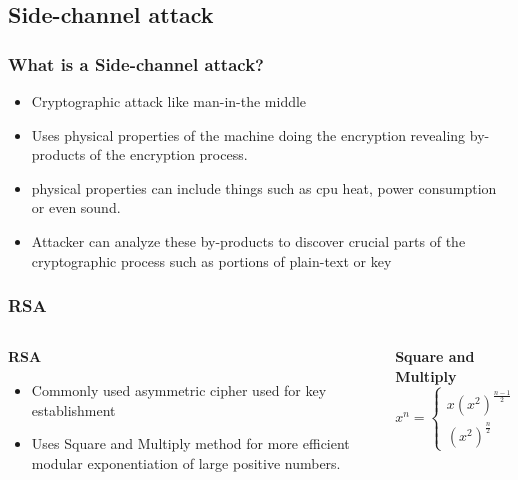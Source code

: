 \documentclass{beamer}
\begin{document}
	\subsection{Side-channel attack}
		\begin{frame}
		\frametitle{What is a Side-channel attack?}
			\begin{itemize}
			\item Cryptographic attack like man-in-the middle\\
			\item Uses physical properties of the machine doing the encryption revealing by-products of the encryption process.  \\
			\item physical properties can include things such as cpu heat, power consumption or even sound.
			\item Attacker can analyze these by-products to discover crucial parts of the cryptographic process such as portions of plain-text or key
		\end{itemize}
		\end{frame}
		\begin{frame}
		\frametitle{RSA}
		\begin{columns}[c]
		\begin{column}{.45\textwidth}
		\textbf{RSA}
		 \begin{itemize}
		 \item Commonly used asymmetric cipher used for key establishment
		 \item Uses Square and Multiply method for more efficient modular exponentiation of large positive numbers.
			\end{itemize}
		 \end{column}
		 
		 \begin{column}{.45\textwidth}
		 \textbf{Square and Multiply}
		 \[x^n = \left\{
  \begin{array}{lr}
    x(x^2)^{\frac{n-1}{2}} &  \text{: if n is odd} \\
    (x^2)^{\frac{n}{2}} & \text{: if n is even}
  \end{array}
\right.
\]
		 \end{column}
		 \end{columns}
		\end{frame}
\end{document}
